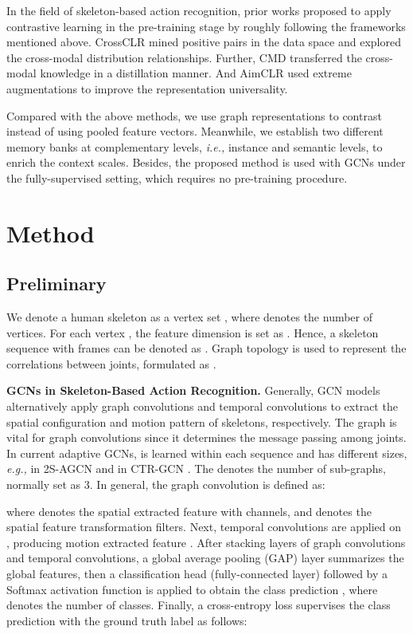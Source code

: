 \documentclass{article} \usepackage{iclr2023_conference,times}
\begin{document}
In the field of skeleton-based action recognition, prior works \citep{crossclr, CMD, Aimclr} proposed to apply contrastive learning in the pre-training stage by roughly following the frameworks mentioned above. CrossCLR \citep{crossclr} mined positive pairs in the data space and explored the cross-modal distribution relationships. Further, CMD \citep{CMD} transferred the cross-modal knowledge in a distillation manner. And AimCLR \citep{Aimclr} used extreme augmentations to improve the representation universality. 

Compared with the above methods, we use graph representations to contrast instead of using pooled feature vectors. Meanwhile, we establish two different memory banks at complementary levels, \emph{i.e.,} instance and semantic levels, to enrich the context scales. Besides, the proposed method is used with GCNs under the fully-supervised setting, which requires no pre-training procedure.




\section{Method}
\subsection{Preliminary}
\label{section:preliminary}
We denote a human skeleton as a vertex set , where  denotes the number of vertices. For each vertex , the feature dimension is set as . Hence, a skeleton sequence with  frames can be denoted as . Graph topology is used to represent the correlations between joints, formulated as .

\noindent \textbf{GCNs in Skeleton-Based Action Recognition.} Generally, GCN models alternatively apply graph convolutions and temporal convolutions to extract the spatial configuration and motion pattern of skeletons, respectively. The graph  is vital for graph convolutions since it determines the message passing among joints. In current adaptive GCNs,  is learned within each sequence and has different sizes, \emph{e.g.,}  in 2S-AGCN \citep{2SAGCN} and  in CTR-GCN \citep{CTRGCN}. The  denotes the number of sub-graphs, normally set as 3.
In general, the graph convolution is defined as:

where  denotes the spatial extracted feature with  channels, and  denotes the spatial feature transformation filters. Next, temporal convolutions are applied on , producing motion extracted feature . After stacking layers of graph convolutions and temporal convolutions, a global average pooling (GAP) layer summarizes the global features, then a classification head (fully-connected layer) followed by a Softmax activation function is applied to obtain the class prediction , where  denotes the number of classes. Finally, a cross-entropy loss  supervises the class prediction with the ground truth label  as follows:
\end{document}
